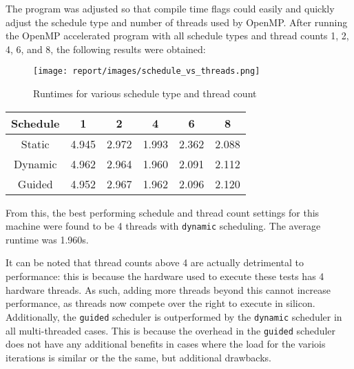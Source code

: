 \documentclass[a4paper]{article}
\begin{document}
            The program was adjusted so that compile time flags could easily and quickly adjust the schedule type and
            number of threads used by OpenMP. After running the OpenMP accelerated program with all schedule types and
            thread counts 1, 2, 4, 6, and 8, the following results were obtained:

            \begin{figure}[!h]
                \centering
                \texttt{[image: report/images/schedule\_vs\_threads.png]}
                \caption{Runtimes for various schedule type and thread count}
            \end{figure}

            \begin{minipage}{\textwidth}
                \centering
                \begin{tabular}{ c c c c c c }
                    Schedule &     1 &     2 &     4 &     6 &     8 \\
                    \hline
                    \hline
                    Static   & 4.945 & 2.972 & 1.993 & 2.362 & 2.088 \\
                    Dynamic  & 4.962 & 2.964 & 1.960 & 2.091 & 2.112 \\
                    Guided   & 4.952 & 2.967 & 1.962 & 2.096 & 2.120 \\
                \end{tabular}
            \end{minipage}
            
            From this, the best performing schedule and thread count settings for this machine were found to be 4
            threads with \texttt{dynamic} scheduling. The average runtime was 1.960s.

            It can be noted that thread counts above 4 are actually detrimental to performance: this is because the
            hardware used to execute these tests has 4 hardware threads. As such, adding more threads beyond this
            cannot increase performance, as threads now compete over the right to execute in silicon. Additionally, the
            \texttt{guided} scheduler is outperformed by the \texttt{dynamic} scheduler in all multi-threaded cases.
            This is because the overhead in the \texttt{guided} scheduler does not have any additional benefits in
            cases where the load for the variois iterations is similar or the the same, but additional drawbacks.
\end{document}
